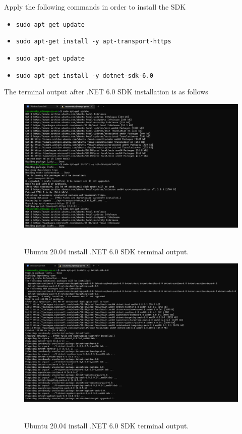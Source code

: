 Apply the following commands in order to install the SDK
\begin{itemize}
    \item \texttt{sudo apt-get update}
    \item \texttt{sudo apt-get install -y apt-transport-https}
    \item \texttt{sudo apt-get update}
    \item \texttt{sudo apt-get install -y dotnet-sdk-6.0}
\end{itemize}
The terminal output after .NET 6.0 SDK installation is as follows
\begin{figure}[H]
    \centering
    \includegraphics[width=1\textwidth]{img/03_4_sdk_install_1}
    ~\caption{Ubuntu 20.04 install .NET 6.0 SDK terminal output.}\label{fig:figure4}
\end{figure}
\begin{figure}[H]
    \centering
    \includegraphics[width=1\textwidth]{img/03_4_sdk_install_2}
    ~\caption{Ubuntu 20.04 install .NET 6.0 SDK terminal output.}\label{fig:figure5}
\end{figure}
